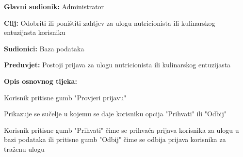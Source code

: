                     \noindent {}
                    \begin{packed_item}
    
                        \item \textbf{Glavni sudionik: }Administrator
                        \item  \textbf{Cilj:} Odobriti ili poništiti zahtjev za ulogu nutricionista ili kulinarskog entuzijasta korisniku
                        \item  \textbf{Sudionici:} Baza podataka
                        \item  \textbf{Preduvjet:} Postoji prijava za ulogu nutricionista ili kulinarskog entuzijasta
                        \item  \textbf{Opis osnovnog tijeka:} 
                        
                        \item[] \begin{packed_enum}
    
                            \item Korisnik pritisne gumb "Provjeri prijavu"
                            \item Prikazuje se sučelje u kojemu se daje korisniku opcija "Prihvati" ili "Odbij"
                            \item Korisnik pritisne gumb "Prihvati" čime se prihvaća prijava korisnika za ulogu u bazi podataka ili pritisne gumb "Odbij" čime se odbija prijava korisnika za traženu ulogu
                        \end{packed_enum}
                        
                    \end{packed_item}  
%
